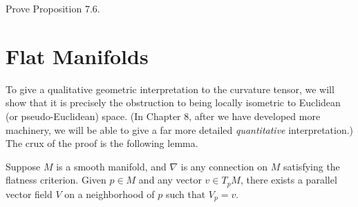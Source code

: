 \begin{exercise}
\label{exer:prove-curvature-isometry}
Prove Proposition 7.6.
\end{exercise}

\section{Flat Manifolds}

To give a qualitative geometric interpretation to the curvature tensor, we will show that it is precisely the obstruction to being locally isometric to Euclidean (or pseudo-Euclidean) space. (In Chapter 8, after we have developed more machinery, we will be able to give a far more detailed \emph{quantitative} interpretation.) The crux of the proof is the following lemma.

\begin{lemma}
\label{lem:parallel-vector-field-flatness}
Suppose $M$ is a smooth manifold, and $\nabla$ is any connection on $M$ satisfying the flatness criterion. Given $p \in M$ and any vector $v \in T_p M$, there exists a parallel vector field $V$ on a neighborhood of $p$ such that $V_p = v$.
\end{lemma}

